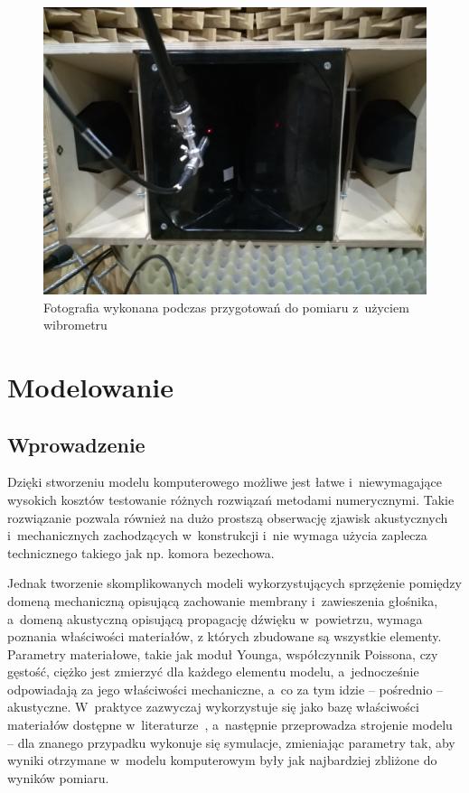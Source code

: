 \documentclass[12pt]{oska}
\begin{document}
	\begin{figure}[!ht]
		\centering
		\includegraphics[width=.7\textwidth]{zdjecie_wibro.jpg}
		\caption{Fotografia wykonana podczas przygotowań do pomiaru z~użyciem wibrometru}
		\label{r:wibro_zdjecie}
	\end{figure}
	
	
	\section{Modelowanie}
	
	\subsection{Wprowadzenie}
	
	Dzięki stworzeniu modelu komputerowego możliwe jest łatwe i~niewymagające wysokich kosztów testowanie różnych rozwiązań metodami numerycznymi. Takie rozwiązanie pozwala również na dużo prostszą obserwację zjawisk akustycznych i~mechanicznych zachodzących w~konstrukcji i~nie wymaga użycia zaplecza technicznego takiego jak np. komora bezechowa. 
	
	Jednak tworzenie skomplikowanych modeli wykorzystujących sprzężenie pomiędzy domeną mechaniczną opisującą zachowanie membrany i~zawieszenia głośnika, a~domeną akustyczną opisującą propagację dźwięku w~powietrzu, wymaga poznania właściwości materiałów, z których zbudowane są wszystkie elementy. Parametry materiałowe, takie jak moduł Younga, współczynnik Poissona, czy gęstość, ciężko jest zmierzyć dla każdego elementu modelu, a~jednocześnie odpowiadają za jego właściwości mechaniczne, a~co za tym idzie -- pośrednio -- akustyczne. W~praktyce zazwyczaj wykorzystuje się jako bazę właściwości materiałów dostępne w~literaturze~\cite{modelowanie}, a~następnie przeprowadza strojenie modelu -- dla znanego przypadku wykonuje się symulacje, zmieniając parametry tak, aby wyniki otrzymane w~modelu komputerowym były jak najbardziej zbliżone do wyników pomiaru.
	
\end{document}

